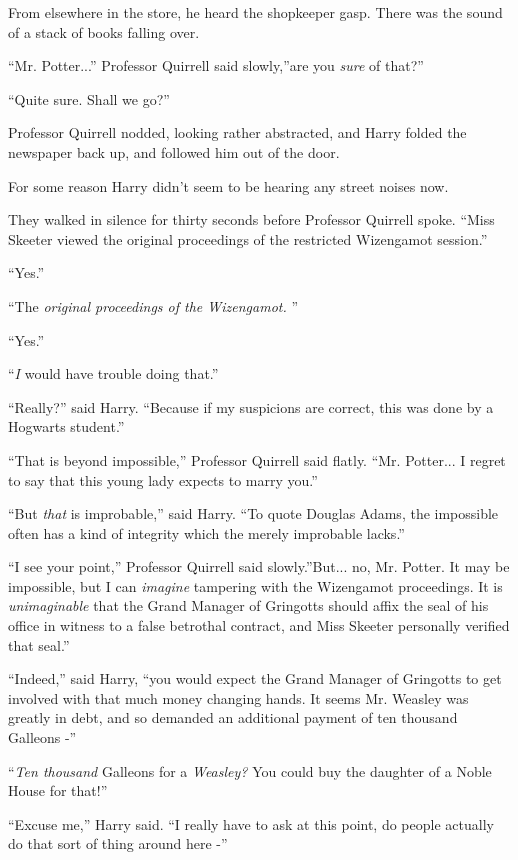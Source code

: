 From elsewhere in the store, he heard the shopkeeper gasp. There was the
sound of a stack of books falling over.

``Mr. Potter...'' Professor Quirrell said slowly,''are you
\emph{sure} of that?''

``Quite sure. Shall we go?''

Professor Quirrell nodded, looking rather abstracted, and Harry folded
the newspaper back up, and followed him out of the door.

For some reason Harry didn't seem to be hearing any street noises now.

They walked in silence for thirty seconds before Professor Quirrell
spoke. ``Miss Skeeter viewed the original proceedings of the restricted
Wizengamot session.''

``Yes.''

``The \emph{original proceedings of the Wizengamot.} ''

``Yes.''

``\emph{I} would have trouble doing that.''

``Really?'' said Harry. ``Because if my suspicions are correct, this was
done by a Hogwarts student.''

``That is beyond impossible,'' Professor Quirrell said flatly. ``Mr.
Potter... I regret to say that this young lady expects to marry
you.''

``But \emph{that} is improbable,'' said Harry. ``To quote Douglas Adams,
the impossible often has a kind of integrity which the merely improbable
lacks.''

``I see your point,'' Professor Quirrell said slowly.''But... no,
Mr. Potter. It may be impossible, but I can \emph{imagine} tampering
with the Wizengamot proceedings. It is \emph{unimaginable} that the
Grand Manager of Gringotts should affix the seal of his office in
witness to a false betrothal contract, and Miss Skeeter personally
verified that seal.''

``Indeed,'' said Harry, ``you would expect the Grand Manager of
Gringotts to get involved with that much money changing hands. It seems
Mr. Weasley was greatly in debt, and so demanded an additional payment
of ten thousand Galleons -''

``\emph{Ten thousand} Galleons for a \emph{Weasley?} You could buy the
daughter of a Noble House for that!''

``Excuse me,'' Harry said. ``I really have to ask at this point, do
people actually do that sort of thing around here -''

